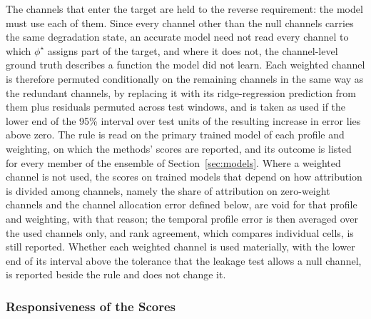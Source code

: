 \documentclass{article}
\newif\ifreview \reviewtrue        %
\newcommand{\rev}[1]{\ifreview\textcolor[HTML]{0B5FA5}{#1}\else#1\fi}
\newcommand{\revwhy}[1]{\ifreview\marginpar{\footnotesize\raggedright\textcolor[HTML]{0B5FA5}{#1}}\fi}
\begin{document}
\rev{The channels that enter the target are held to the reverse requirement: the model must use each of them. Since every channel other than the null channels carries the same degradation state, an accurate model need not read every channel to which $\phi^{\star}$ assigns part of the target, and where it does not, the channel-level ground truth describes a function the model did not learn. Each weighted channel is therefore permuted conditionally on the remaining channels in the same way as the redundant channels, by replacing it with its ridge-regression prediction from them plus residuals permuted across test windows, and is taken as used if the lower end of the 95\% interval over test units of the resulting increase in error lies above zero. The rule is read on the primary trained model of each profile and weighting, on which the methods' scores are reported, and its outcome is listed for every member of the ensemble of Section~\ref{sec:models}. Where a weighted channel is not used, the scores on trained models that depend on how attribution is divided among channels, namely the share of attribution on zero-weight channels and the channel allocation error defined below, are void for that profile and weighting, with that reason; the temporal profile error is then averaged over the used channels only, and rank agreement, which compares individual cells, is still reported. Whether each weighted channel is used materially, with the lower end of its interval above the tolerance that the leakage test allows a null channel, is reported beside the rule and does not change it.}\revwhy{X4: channel-usage gate}
 
\subsubsection{Responsiveness of the Scores}
 
\end{document}
